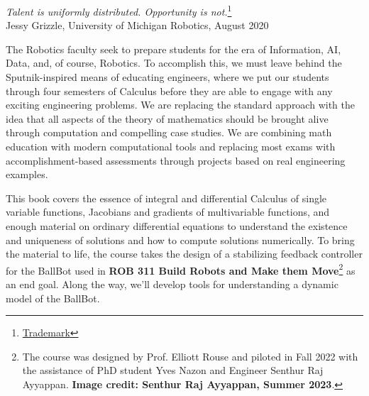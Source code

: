 



\hfill \textit{\Large Talent is uniformly distributed. Opportunity is not.}\footnote{\href{https://trademarks.justia.com/870/43/talent-is-equally-distributed-globally-but-opportunity-is-87043434.html}{Trademark}}\\

\hfill Jessy Grizzle, University of Michigan Robotics, August 2020


\bigskip

The Robotics faculty seek to prepare students for the era of Information, AI, Data, and, of course, Robotics. To accomplish this, we must leave behind the Sputnik-inspired means of educating engineers, where we put our students through four semesters of Calculus before they are able to engage with any exciting engineering problems. We are replacing the standard approach with the idea that all aspects of the theory of mathematics should be brought alive through computation and compelling case studies. We are combining math education with modern computational tools and replacing most exams with accomplishment-based assessments through projects based on real engineering examples.

This book covers the essence of integral and differential Calculus of single variable functions, Jacobians and gradients of multivariable functions, and enough material on ordinary differential equations to understand the existence and uniqueness of solutions and how to compute solutions numerically. To bring the material to life, the course takes the design of a stabilizing feedback controller for the BallBot used in \textbf{ROB 311 Build Robots and Make them Move}\footnote{The course was designed 
 by Prof. Elliott Rouse and piloted in Fall 2022 with the assistance of PhD student Yves Nazon and Engineer  Senthur Raj Ayyappan. \textbf{Image credit: Senthur Raj Ayyappan, Summer 2023}.} as an end goal. Along the way, we'll develop tools for understanding a dynamic model of the BallBot.
    
